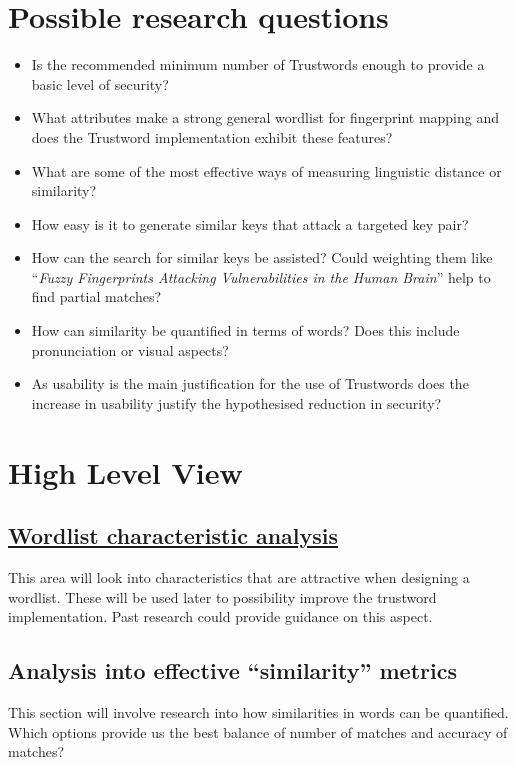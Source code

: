 \section{Possible research questions}
\begin{itemize}
    \item Is the recommended minimum number of Trustwords enough to provide a basic level of security?
    
    \item What attributes make a strong general wordlist for fingerprint mapping and does the Trustword implementation exhibit these features?
    
    \item What are some of the most effective ways of measuring linguistic distance or similarity?

    \item How easy is it to generate similar keys that attack a targeted key pair?
    
    \item How can the search for similar keys be assisted? Could weighting them like ``\textit{Fuzzy Fingerprints Attacking Vulnerabilities in the Human Brain}'' help to find partial matches?

    \item How can similarity be quantified in terms of words? Does this include pronunciation or visual aspects?
    
    \item As usability is the main justification for the use of Trustwords does the increase in usability justify the hypothesised reduction in security?
\end{itemize}

\newpage
\section{High Level View}

\subsection*{\hyperref[ref:wordlist]{Wordlist characteristic analysis}}
This area will look into characteristics that are attractive when designing a wordlist. These will be used later to possibility improve the trustword implementation. Past research could provide guidance on this aspect.

\subsection*{Analysis into effective ``similarity'' metrics}
This section will involve research into how similarities in words can be quantified. Which options provide us the best balance of number of matches and accuracy of matches?

